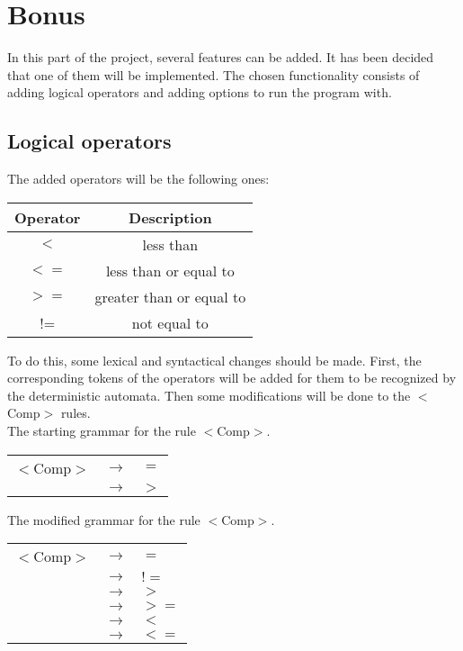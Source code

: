 \documentclass{article}
\begin{document}
\section{Bonus}
In this part of the project, several features can be added. It has been decided that one of them will be implemented. The chosen functionality consists of adding logical operators and adding options to run the program with.

\subsection{Logical operators}
The added operators will be the following ones:

\begin{center}
\begin{tabular}{|c|c|}
\hline
\textbf{Operator} & \textbf{Description}\\
\hline\hline
$<$ & less than  \\
\hline
$<=$ & less than or equal to  \\
\hline
$>=$ & greater than or equal to  \\
\hline
!= & not equal to  \\
\hline
\end{tabular}
\end{center}

To do this, some lexical and syntactical changes should be made. First, the corresponding tokens of the operators will be added for them to be recognized by the deterministic automata. Then some modifications will be done to the $<$Comp$>$ rules.\\

The starting grammar for the rule $<$Comp$>$.

\begin{center}
\begin{tabular}{|m{2cm} m{0.5cm} m{4cm}|} 
\hline
$<$Comp$>$ & $\to$ & $=$\\
& $\to$ & $>$\\
\hline
\end{tabular}
\end{center}

The modified grammar for the rule $<$Comp$>$.

\begin{center}
\begin{tabular}{|m{2cm} m{0.5cm} m{4cm}|} 
\hline
$<$Comp$>$ & $\to$ & $=$\\
& $\to$ & $!=$\\
& $\to$ & $>$\\
& $\to$ & $>=$\\
& $\to$ & $<$\\
& $\to$ & $<=$\\
\hline
\end{tabular}
\end{center}
\end{document}
